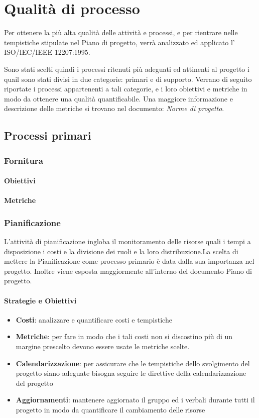 \section{Qualità di processo}
Per ottenere la più alta qualità delle attività e processi, e per rientrare nelle tempistiche stipulate nel Piano di progetto, verrà analizzato ed applicato l' ISO/IEC/IEEE 12207:1995.

Sono stati scelti quindi i processi ritenuti più adeguati ed attinenti al progetto i quail sono stati divisi in due categorie: primari e di supporto. Verrano di seguito riportate i processi appartenenti a tali categorie, e i loro obiettivi e metriche in modo da ottenere una qualità quantificabile.
Una maggiore informazione e descrizione delle metriche si trovano nel documento: \textit{Norme di progetto}.
    \subsection{Processi primari}
        \subsubsection{Fornitura}
            \paragraph{Obiettivi}
            \paragraph{Metriche}
            
        \subsubsection{Pianificazione}
        L'attività di pianificazione ingloba il monitoramento delle risorse quali i tempi a disposizione i costi e la divisione dei ruoli e la loro distribuzione.La scelta di mettere la Pianificazione come processo primario è data dalla sua importanza nel progetto. Inoltre viene esposta maggiormente all'interno del documento Piano di progetto.
            \paragraph{Strategie e Obiettivi}
                \begin{itemize}
                    \item \textbf{Costi}: analizzare e quantificare costi e tempistiche
                    \item \textbf{Metriche}: per fare in modo che i  tali costi non si discostino più di un margine prescelto devono essere usate le metriche scelte.
                    \item \textbf{Calendarizzazione}: per assicurare che le tempistiche dello svolgimento del progetto siano adeguate bisogna seguire le direttive della calendarizzazione del progetto
                    \item \textbf{Aggiornamenti}: mantenere aggiornato il gruppo ed i verbali durante tutti il progetto in modo da quantificare il cambiamento delle risorse
                \end{itemize}
                
